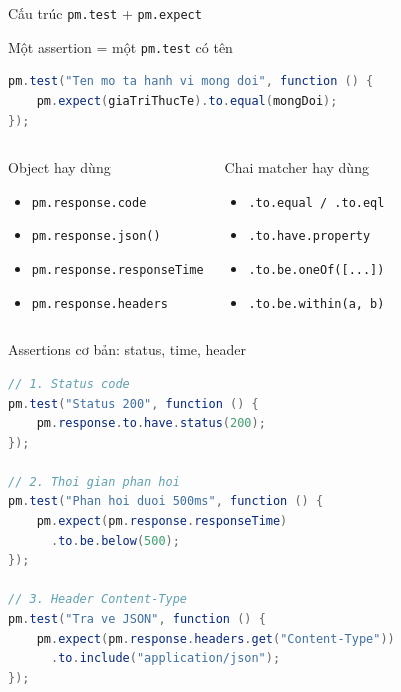 \documentclass[aspectratio=169,12pt]{beamer}
\begin{document}
\begin{frame}[fragile]{Cấu trúc \texttt{pm.test} + \texttt{pm.expect}}
  \begin{block}{Một assertion = một \texttt{pm.test} có tên}
\begin{lstlisting}[language=Java]
pm.test("Ten mo ta hanh vi mong doi", function () {
    pm.expect(giaTriThucTe).to.equal(mongDoi);
});
\end{lstlisting}
  \end{block}

  \begin{columns}[T]
    \begin{block}{Object hay dùng}
      \small
      \begin{itemize}
        \item \texttt{pm.response.code}
        \item \texttt{pm.response.json()}
        \item \texttt{pm.response.responseTime}
        \item \texttt{pm.response.headers}
      \end{itemize}
    \end{block}

    \begin{block}{Chai matcher hay dùng}
      \small
      \begin{itemize}
        \item \texttt{.to.equal / .to.eql}
        \item \texttt{.to.have.property}
        \item \texttt{.to.be.oneOf([...])}
        \item \texttt{.to.be.within(a, b)}
      \end{itemize}
    \end{block}
  \end{columns}
\end{frame}

\begin{frame}[fragile]{Assertions cơ bản: status, time, header}
\begin{lstlisting}[language=Java]
// 1. Status code
pm.test("Status 200", function () {
    pm.response.to.have.status(200);
});

// 2. Thoi gian phan hoi
pm.test("Phan hoi duoi 500ms", function () {
    pm.expect(pm.response.responseTime)
      .to.be.below(500);
});

// 3. Header Content-Type
pm.test("Tra ve JSON", function () {
    pm.expect(pm.response.headers.get("Content-Type"))
      .to.include("application/json");
});
\end{lstlisting}
\end{frame}
\end{document}
